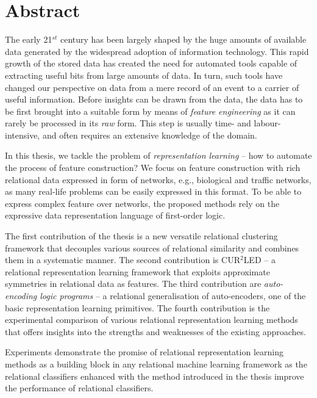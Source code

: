 \chapter{Abstract}                                 \label{ch:abstract}

The early 21$^{st}$ century has been largely shaped by the huge amounts of available data generated by the widespread adoption of information technology.
This rapid growth of the stored data has created the need for automated tools capable of extracting useful bits from large amounts of data.
In turn, such tools have changed our perspective on data from a mere record of an event to a carrier of useful information.
Before insights can be drawn from the data, the data has to be first brought into a suitable form by means of \textit{feature engineering} as it can rarely be processed in its \textit{raw} form.
This step is usually time- and labour-intensive, and often requires an extensive knowledge of the domain.


In this thesis, we tackle the problem of \textit{representation learning} -- how to automate the process of feature construction?
We focus on feature construction with rich relational data expressed in form of networks, e.g., biological and traffic networks, as many real-life problems can be easily expressed in this format.
To be able to express complex feature over networks, the proposed methods rely on the expressive data representation language of first-order logic.


The first contribution of the thesis is a new versatile relational clustering framework that decouples various sources of relational similarity and combines them in a systematic manner.
The second contribution is CUR$^2$LED -- a relational representation learning framework that exploits approximate symmetries in relational data as features.
The third contribution are \textit{auto-encoding logic programs}  -- a relational generalisation of auto-encoders, one of the basic representation learning primitives.
The fourth contribution is the experimental comparison of various relational representation learning methods that offers insights into the strengths and weaknesses of the existing approaches.


Experiments demonstrate the promise of relational representation learning methods as a building block in any relational machine learning framework as the relational classifiers enhanced with the method introduced in the thesis improve the performance of relational classifiers.



\cleardoublepage

